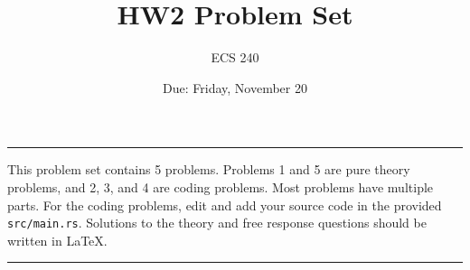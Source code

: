 \documentclass{article}
\theoremstyle{plain}
\begin{document}
\title{HW2 Problem Set}
\author{ECS 240}
\date{Due: Friday, November 20}

\maketitle

\hrule

\bigskip

\noindent
This problem set contains 5 problems.
Problems 1 and 5 are pure theory problems, and 2, 3, and 4 are coding problems.
Most problems have multiple parts.
For the coding problems, edit and add your source code in the provided \texttt{src/main.rs}.
Solutions to the theory and free response questions should be written in LaTeX.

\bigskip

\hrule

\bigskip
\end{document}

